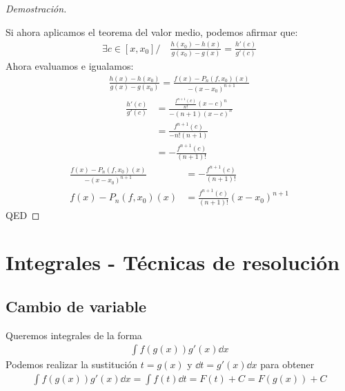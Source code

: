 \documentclass{article}
\begin{document}
\begin{proof}[Demostración]
\begin{itemize}
    \end{itemize}
    Si ahora aplicamos el teorema del valor medio, podemos afirmar que:
    \begin{equation}
        \begin{split}
            \exists c \in [x,x_{0}] / \quad \frac{h(x_0)-h(x)}{g(x_0)-g(x)} = \frac{h'(c)}{g'(c)}
        \end{split}
    \end{equation}
    Ahora evaluamos e igualamos:
    \begin{equation}
        \begin{split}
            \frac{h(x)-h(x_{0})}{g(x)-g(x_{0})} = \frac{f(x)- P_{n}(f,x_{0})(x)}{-(x-x_{0})^{n+1}}
        \end{split}
    \end{equation}
    \begin{equation}
        \begin{split}
            \frac{h'(c)}{g'(c)} &= \frac{\frac{f^{n+1}(c)}{n!}(x-c)^{n}}{-(n+1)(x-c)^{n}}\\
            &= \frac{f^{n+1}(c)}{-n!(n+1)} \\
            &= -\frac{f^{n+1}(c)}{(n+1)!}
        \end{split}
    \end{equation}
    \begin{equation}
        \begin{split}
            \frac{f(x)- P_{n}(f,x_{0})(x)}{-(x-x_{0})^{n+1}} &= -\frac{f^{n+1}(c)}{(n+1)!}\\
            f(x)- P_{n}(f,x_{0})(x) &= \frac{f^{n+1}(c)}{(n+1)!}(x-x_{0})^{n+1}
        \end{split}
    \end{equation}
    QED
\end{proof}
\section{Integrales - Técnicas de resolución}
\subsection{Cambio de variable}
Queremos integrales de la forma
\begin{equation}
    \begin{split}
        \int f(g(x))g'(x) \dd{x}
    \end{split}
\end{equation}
Podemos realizar la sustitución $t=g(x)$ y $\dd{t}=g'(x)\dd{x}$ para obtener
\begin{equation}
    \begin{split}
        \int f(g(x))g'(x) \dd{x} = \int f(t) \dd{t} = F(t)+C = F(g(x)) + C
    \end{split}
\end{equation}
\end{document}
